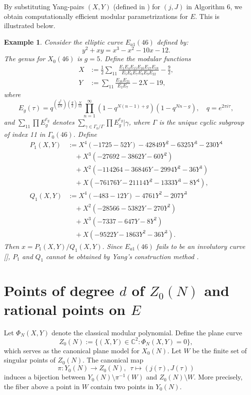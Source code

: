 \documentclass[10pt, a4paper]{article}
\newtheorem{example}[theorem]{Example}
\begin{document}
By substituting Yang-pairs $(X,Y)$ (defined in \cite{Yang,Chen})  for $(j,J)$ in Algorithm 6, we obtain computationally efficient modular parametrizations for $E$. This is illustrated below.
\begin{example}
Consider the elliptic curve $E_{a1}(46)$  defined by:
\[ y^2 + xy = x^3 - x^2 - 10x - 12. \]
The  genus  for $X_0(46)$ is $g = 5$.
Define the modular functions
\begin{align*}
X &:= \frac{1}{2}\sum_{11} \frac{E_1E_4E_{15}E_{16}E_{17}E_{18}}{E_5E_6E_7E_8E_9E_{22}} - \frac{9}{2}, \\
Y &:= \sum_{11} \frac{E_{16}E_{21}}{E_2E_7} - 2X - 19,
\end{align*}
where
\[ E_g(\tau) = q^{\left(\frac{g^2}{2N}\right)\left(\frac{g}{2}\right)\frac{N}{12}} \prod_{n=1}^{\infty} (1-q^{N(n-1)+g})(1-q^{Nn-g}), \quad q = e^{2\pi i\tau}, \]
and $\sum\limits_{11} {\prod {E_g^{{e_g}}} }$ denotes $\sum\limits_{\gamma  \in {\Gamma _0}/\Gamma } {\prod {E_g^{{e_g}}|\gamma } } $, where $\Gamma$  is  the unique cyclic subgroup of index 11 in $\Gamma_0(46)$.
Define
\begin{align*}
P_1(X,Y) &:= X^4 (-1725 - 52Y) - 42849Y^2 - 6325Y^3 - 230Y^4 \\
       &\quad + X^3 (-27692 - 3862Y - 60Y^2) \\
       &\quad + X^2 (-114264 - 36846Y - 2994Y^2 - 36Y^3) \\
       &\quad + X(-76176Y - 21114Y^2 - 1333Y^3 - 8Y^4), \\
Q_1(X,Y) &:= X^4 (-483 - 12Y) - 4761Y^2 - 207Y^3 \\
         &\quad + X^2 (-28566 - 5382Y - 270Y^2) \\
         &\quad + X^3 (-7337 - 647Y - 8Y^2) \\
         &\quad + X(-9522Y - 1863Y^2 - 36Y^3).
\end{align*}
Then $x = P_1(X,Y)/Q_1(X,Y)$.
Since ${E_{a1}}(46)$ fails to be an involutory curve [\cite{Delaunay}],
$P_1$ and $Q_1$ cannot   be obtained by Yang's construction method \cite{Yang}.
\end{example}

\section{Points of degree $d$  of   $Z_0(N)$ and  rational points on $E$}

Let $\Phi_N(X,Y)$ denote the classical modular polynomial. Define the plane curve
\[ Z_0(N) := \{(X,Y) \in \mathbb{C}^2 : \Phi_N(X,Y) = 0\}, \]
which serves as the canonical plane model for $X_0(N)$. Let $W$ be the finite set of singular points of $Z_0(N)$. The canonical map
\[ \pi: Y_0(N) \rightarrow Z_0(N), \,\,\, \tau \mapsto (j(\tau), J(\tau)) \]
 induces a bijection between $Y_0(N) \setminus \pi^{-1}(W)$ and $Z_0(N) \setminus W$.
More precisely, the fiber above a point in $W$ contain two points in $Y_0(N)$.
\end{document}
